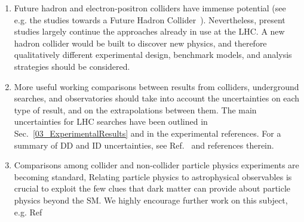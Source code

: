 \begin{issues}
\begin{enumerate}
\item Future hadron and electron-positron colliders have immense potential (see e.g. the studies towards a Future Hadron Collider~\cite{Golling:2016gvc}). Nevertheless, present studies largely continue the approaches already in use at the LHC. A new hadron collider would be built to discover new physics, and therefore qualitatively different experimental design, benchmark models, and analysis strategies should be considered.

\item More useful working comparisons between results from colliders, underground searches, and observatories should take into account the uncertainties on each type of result, and on the extrapolations between them.
  The main uncertainties for LHC searches have been outlined in Sec.~\ref{03_ExperimentalResults} and in the experimental references.
  For a summary of DD and ID uncertainties, see Ref.~\cite{Feldstein:2014ufa,d300ef23986a49099715e661295a4d72} and references therein.

\item Comparisons among collider and non-collider particle physics experiments are becoming standard, Relating particle physics to astrophysical observables is crucial to exploit the few clues that dark matter can provide about particle physics beyond the SM. We highly encourage further work on this subject, e.g. Ref~\cite{Buckley:2017ijx}

\end{enumerate}
\end{issues}

